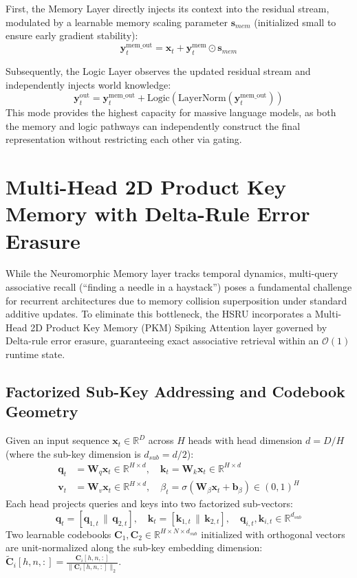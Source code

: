 \documentclass[11pt,a4paper]{article}
\begin{document}
First, the Memory Layer directly injects its context into the residual stream, modulated by a learnable memory scaling parameter $\mathbf{s}_{mem}$ (initialized small to ensure early gradient stability):
\begin{equation}
    \mathbf{y}_t^{\text{mem\_out}} = \mathbf{x}_t + \mathbf{y}_t^{\text{mem}} \odot \mathbf{s}_{mem}
\end{equation}

Subsequently, the Logic Layer observes the updated residual stream and independently injects world knowledge:
\begin{equation}
    \mathbf{y}_t^{\text{out}} = \mathbf{y}_t^{\text{mem\_out}} + \text{Logic}(\text{LayerNorm}(\mathbf{y}_t^{\text{mem\_out}}))
\end{equation}
This mode provides the highest capacity for massive language models, as both the memory and logic pathways can independently construct the final representation without restricting each other via gating.

\section{Multi-Head 2D Product Key Memory with Delta-Rule Error Erasure}
While the Neuromorphic Memory layer tracks temporal dynamics, multi-query associative recall (``finding a needle in a haystack'') poses a fundamental challenge for recurrent architectures due to memory collision superposition under standard additive updates. To eliminate this bottleneck, the HSRU incorporates a Multi-Head 2D Product Key Memory (PKM) Spiking Attention layer governed by Delta-rule error erasure, guaranteeing exact associative retrieval within an $\mathcal{O}(1)$ runtime state.

\subsection{Factorized Sub-Key Addressing and Codebook Geometry}
Given an input sequence $\mathbf{x}_t \in \mathbb{R}^D$ across $H$ heads with head dimension $d = D/H$ (where the sub-key dimension is $d_{sub} = d/2$):
\begin{align}
    \mathbf{q}_t &= \mathbf{W}_q \mathbf{x}_t \in \mathbb{R}^{H \times d}, \quad \mathbf{k}_t = \mathbf{W}_k \mathbf{x}_t \in \mathbb{R}^{H \times d} \\
    \mathbf{v}_t &= \mathbf{W}_v \mathbf{x}_t \in \mathbb{R}^{H \times d}, \quad \beta_t = \sigma(\mathbf{W}_\beta \mathbf{x}_t + \mathbf{b}_\beta) \in (0, 1)^H
\end{align}
Each head projects queries and keys into two factorized sub-vectors:
\begin{equation}
    \mathbf{q}_t = [\mathbf{q}_{1,t} \,\|\, \mathbf{q}_{2,t}], \quad \mathbf{k}_t = [\mathbf{k}_{1,t} \,\|\, \mathbf{k}_{2,t}], \quad \mathbf{q}_{i,t}, \mathbf{k}_{i,t} \in \mathbb{R}^{d_{sub}}
\end{equation}
Two learnable codebooks $\mathbf{C}_1, \mathbf{C}_2 \in \mathbb{R}^{H \times N \times d_{sub}}$ initialized with orthogonal vectors are unit-normalized along the sub-key embedding dimension: $\tilde{\mathbf{C}}_i[h, n, :] = \frac{\mathbf{C}_i[h, n, :]}{\|\mathbf{C}_i[h, n, :]\|_2}$.
\end{document}
